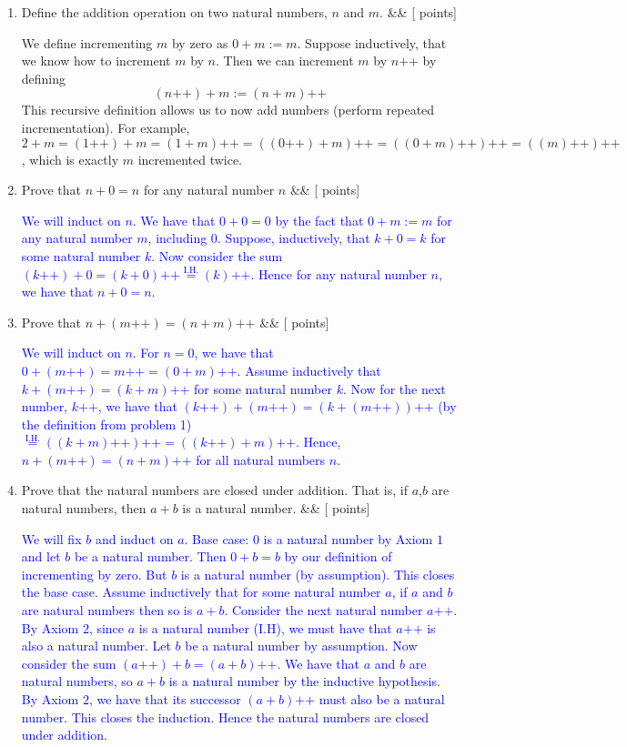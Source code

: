 \documentclass[12pt]{article}
\newcommand{\points}[1]{\hfill {[#1 points]}}
\newcommand{\problem}[2][]{%
  \item {#2}%
  \ifx&#1&%
  \else%
    \points{#1}%
  \fi
  \par\vspace{0.5em}
}
\begin{document}
\begin{enumerate}[leftmargin=*, label=\textbf{\arabic*.}]

    \problem{Define the addition operation on two natural numbers, $n$ and $m$.}
	We define incrementing $m$ by zero as $0 + m := m$. Suppose inductively, that we know how to increment $m$ by $n$. Then we can increment $m$ by $n$++ by defining $$(n\text{++}) + m := (n + m)\text{++}$$ This recursive definition allows us to now add numbers (perform repeated incrementation). For example, $2+m = (1\text{++})+m = (1+m)\text{++} = ((0\text{++})+m)\text{++} = ((0+m)\text{++})\text{++} = ((m)\text{++})\text{++}$, which is exactly $m$ incremented twice.
	
    \problem{Prove that $n+0 = n$ for any natural number $n$}
        	\textcolor{blue}{ We will induct on $n$. We have that $0+0 = 0$ by the fact that $0 + m := m$ for any natural number $m$, including $0$. Suppose, inductively, that $k+0=k$ for some natural number $k$. Now consider the sum $(k\text{++}) + 0 = (k+0)\text{++} \overset{\text{I.H.}}{=} (k)\text{++}$. Hence for any natural number $n$, we have that $n+0 = n$.
}

    \problem{Prove that $n + (m\text{++}) = (n + m)\text{++}$}
        	\textcolor{blue}{We will induct on $n$. For $n = 0$, we have that $0 + (m\text{++}) = m\text{++} = (0 + m)\text{++}$. Assume inductively that $k + (m\text{++}) = (k + m)\text{++}$ for some natural number $k$. Now for the next number, $k\text{++}$, we have that $(k\text{++}) + (m\text{++}) = (k + (m\text{++}))\text{++}$ (by the definition from problem 1) $\overset{\text{I.H.}}{=} ((k+m)\text{++})\text{++} = ((k\text{++}) + m)\text{++}$. Hence, $n + (m\text{++}) = (n + m)\text{++}$ for all natural numbers $n$.}
	
	
	 \problem{Prove that the natural numbers are closed under addition. That is, if $a$,$b$ are natural numbers, then $a+b$ is a natural number.}
    	\textcolor{blue}{We will fix $b$ and induct on $a$. Base case: $0$ is a natural number by Axiom $1$ and let $b$ be a natural number. Then $0+b = b$ by our definition of incrementing by zero. But $b$ is a natural number (by assumption). This closes the base case. Assume inductively that for some natural number $a$, if $a$ and $b$ are natural numbers then so is $a+b$. Consider the next natural number $a\text{++}$. By Axiom $2$, since $a$ is a natural number (I.H), we must have that $a\text{++}$ is also a natural number. Let $b$ be a natural number by assumption. Now consider the sum $(a\text{++}) + b = (a+b)\text{++}$. We have that $a$ and $b$ are natural numbers, so $a+b$ is a natural number by the inductive hypothesis. By Axiom $2$, we have that its successor $(a+b)\text{++}$ must also be a natural number. This closes the induction. Hence the natural numbers are closed under addition.}
	

\end{enumerate}
\end{document}
